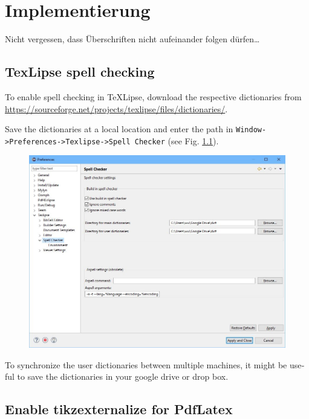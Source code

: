 \chapter{Implementierung} \label{cha:Implementierung}

Nicht vergessen, dass Überschriften nicht aufeinander folgen dürfen\ldots

\begin{otherlanguage}{english}
\section{TexLipse spell checking}
%
To enable spell checking in TeXLipse, download the respective dictionaries from 
\url{https://sourceforge.net/projects/texlipse/files/dictionaries/}.

Save the dictionaries at a local location and enter the path in \texttt{Window->Preferences->Tex\-lipse->Spell Checker} (see Fig. \ref{fig:dict_path}).
%
\begin{figure}[htb]
	\centering
	\includegraphics[scale=0.40]{images/Spell_Checker_preferences.jpg}
	\label{fig:dict_path}
\end{figure}

To synchronize the user dictionaries between multiple machines, it might be useful to save the dictionaries in your google drive or drop box.

\section{Enable tikzexternalize for PdfLatex}


\end{otherlanguage}
